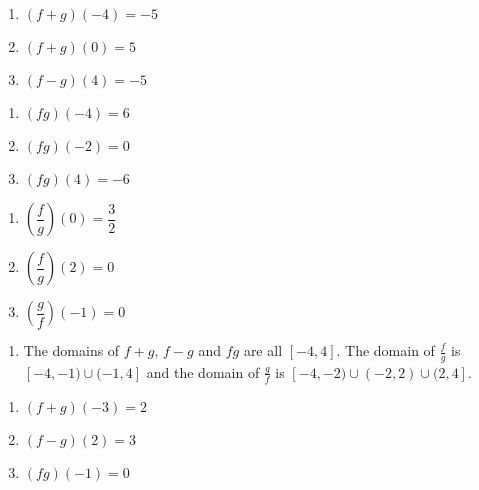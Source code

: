 \begin{multicols}{3}
\begin{enumerate}
\setcounter{enumi}{\value{HW}}

\item $(f + g)(-4) = -5$   
\item $(f + g)(0) = 5$
\item $(f-g)(4) = -5$

\setcounter{HW}{\value{enumi}}
\end{enumerate}
\end{multicols}


\begin{multicols}{3}
\begin{enumerate}
\setcounter{enumi}{\value{HW}}

\item $(fg)(-4) = 6$ 
\item $(fg)(-2) = 0$
\item $(fg)(4) = -6$

\setcounter{HW}{\value{enumi}}
\end{enumerate}
\end{multicols}

\enlargethispage{0.5in}

\begin{multicols}{3}
\begin{enumerate}
\setcounter{enumi}{\value{HW}}

\item $\left(\dfrac{f}{g}\right)(0) = \dfrac{3}{2}$
\item $\left(\dfrac{f}{g}\right)(2) =  0$
\item $\left(\dfrac{g}{f}\right)(-1) = 0$ 

\setcounter{HW}{\value{enumi}}
\end{enumerate}
\end{multicols}

\begin{enumerate}
\setcounter{enumi}{\value{HW}}

\item The domains of $f+g$, $f-g$ and $fg$ are all $[-4,4]$.  The domain of $\frac{f}{g}$ is $[-4, -1) \cup (-1,4]$ and the domain of $\frac{g}{f}$ is $[-4, -2) \cup (-2,2) \cup (2, 4]$.

\setcounter{HW}{\value{enumi}}
\end{enumerate}


\begin{multicols}{3}
\begin{enumerate}
\setcounter{enumi}{\value{HW}}

\item $(f + g)(-3) = 2$
\item $(f - g)(2) = 3$
\item $(fg)(-1) = 0$

\setcounter{HW}{\value{enumi}}
\end{enumerate}
\end{multicols}

